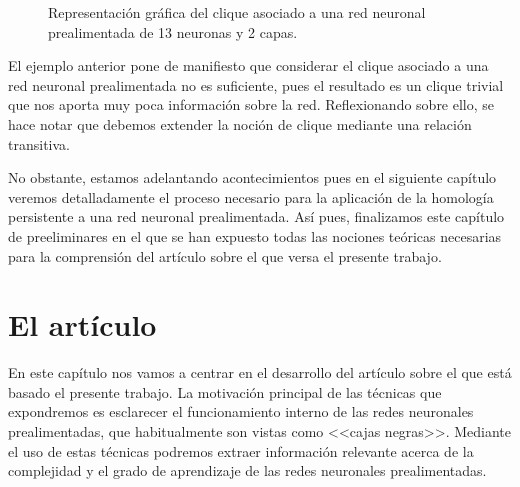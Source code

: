 \documentclass[12pt, a4paper, twoside]{book}
\numberwithin{equation}{section}
\theoremstyle{definition}
\newenvironment{ejem}
  {\pushQED{\qed}\renewcommand{\qedsymbol}{$\blacktriangleleft$}\ejemplo}
  {\popQED\endejemplo}
\theoremstyle{remark}
\theoremstyle{plain}
\begin{document}
\begin{ejem}
\begin{figure}[H]
			\caption{Representación gráfica del clique asociado a una red neuronal prealimentada de 13 neuronas y 2 capas.}
			\label{fig:cliqueEjem}
		\end{figure}
	\end{ejem}

	El ejemplo anterior pone de manifiesto que considerar el clique 
	asociado a una red neuronal prealimentada no es suficiente, pues el 
	resultado es un clique trivial que nos aporta muy poca información 
	sobre la red. Reflexionando sobre ello, se hace notar que debemos 
	extender la noción de clique mediante una relación transitiva. 

	No obstante, estamos adelantando acontecimientos pues en el siguiente 
	capítulo veremos detalladamente el proceso necesario para la 
	aplicación de la homología persistente a una red neuronal 
	prealimentada. Así pues, finalizamos este capítulo de preeliminares en
	el que se han expuesto todas las nociones teóricas necesarias para la 
	comprensión del artículo sobre el que versa el presente trabajo.

	\newpage

	\chapter{El artículo}
	
	En este capítulo nos vamos a centrar en el desarrollo del artículo 
	\cite{Articulo-Watanabe} sobre el que está basado el presente trabajo. 
	La motivación principal de las técnicas que expondremos es esclarecer
	el funcionamiento interno de las redes neuronales prealimentadas, que 
	habitualmente son vistas como <<cajas negras>>. Mediante el uso de 
	estas técnicas podremos extraer información relevante acerca de la 
	complejidad y el grado de aprendizaje de las redes neuronales 
	prealimentadas. 
\end{document}
